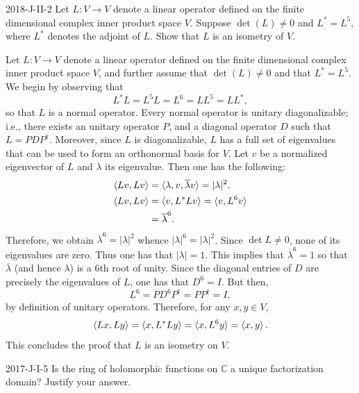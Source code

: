 \documentclass{article}
\begin{document}
	\begin{prb}{2018-J-II-2}
		Let $L: V \to V$ denote a linear operator defined on the finite dimensional complex inner product space $V$. Suppose $\det(L) \neq 0$ and $L^{\ast} = L^{5}$, where $L^{\ast}$ denotes the adjoint of $L$. Show that $L$ is an isometry of $V$. 
	\end{prb}
	Let $L: V \to V$ denote a linear operator defined on the finite dimensional complex inner product space $V$, and further assume that $\det(L) \neq 0$ and that $L^{\ast} = L^{5}$. We begin by observing that 
	\begin{equation*}
		L^{\ast}L = L^{5}L = L^{6} = LL^{5} = LL^{\ast}, 
	\end{equation*}
	so that $L$ is a normal operator. Every normal operator is unitary diagonalizable; i.e., there exists an unitary operator $P$, and a diagonal operator $D$ such that $L = PDP^{\dagger}$. Moreover, since $L$ is diagonalizable, $L$ has a full set of eigenvalues that can be used to form an orthonormal basis for $V$. Let $v$ be a normalized eigenvector of $L$ and $\lambda$ its eigenvalue. Then one has the following: 
	\begin{align*}
		\begin{split}
			\braket{Lv, Lv} &= \braket{\lambda, v, \overline{\lambda}v} = |\lambda|^{2}. \\
			\braket{Lv,Lv} &= \braket{v, L^{\ast}Lv} = \braket{v, L^{6}v} \\
			&= \overline{\lambda}^{6}. 
		\end{split}
	\end{align*}
	Therefore, we obtain $\overline{\lambda}^{6} = |\lambda|^{2}$ whence $|\lambda|^{6} = |\lambda|^{2}$. Since $\det{L}\neq 0$, none of its eigenvalues are zero. Thus one has that $|\lambda| = 1$. This implies that $\overline{\lambda}^{6} = 1$ so that $\overline{\lambda}$ (and hence $\lambda$) is a 6th root of unity. Since the diagonal entries of $D$ are precisely the eigenvalues of $L$, one has that $D^{6} = I$. But then, 
	\begin{equation*}
		L^{6} = PD^{6}P^{\dagger} = PP^{\dagger} = I, 
	\end{equation*}
	by definition of unitary operators. Therefore, for any $x, y \in V$, 
	\begin{equation*}
		\braket{Lx, Ly} = \braket{x, L^{\ast}Ly} = \braket{x, L^{6}y} = \braket{x, y}. 
	\end{equation*}	
	This concludes the proof that $L$ is an isometry on $V$. 
	\begin{prb}{2017-J-I-5}
		Is the ring of holomorphic functions on $\mathbb{C}$ a unique factorization domain? Justify your answer. 
	\end{prb}
\end{document}
